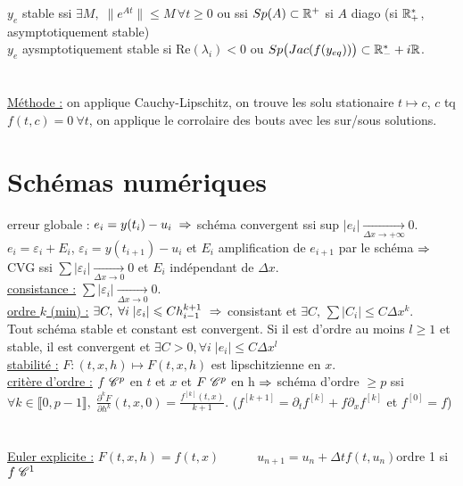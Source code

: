 \documentclass[12 pt]{exampleclass}
\begin{document}
$y_e$ stable ssi $\exists M, \; \|e^{At}\| \leqslant M \, \forall t\geqslant 0$ ou ssi $Sp(A)\subset \mathbb{R}^+$ si $A$ diago (si $\mathbb{R}_+^*$, asymptotiquement stable)\\
$y_e$ aysmptotiquement stable si Re$(\lambda_i)<0$ ou $Sp\big(Jac(f(y_{eq}))\big) \subset \mathbb{R}_-^* + i\mathbb{R}$.\\
\text{}\\
\text{}\\
\underline{Méthode :} on applique Cauchy-Lipschitz, on trouve les solu stationaire $t\mapsto c$, $c$ tq $f(t,c) = 0 \ \forall t$, on applique le corrolaire des bouts avec les sur/sous solutions.\\

\section{Schémas numériques}
erreur globale : $e_i = y(t_i) -u_i \; \Rightarrow$ schéma convergent ssi sup $|e_i| \underset{\Delta x\to +\infty}{\longrightarrow}0$.\\
$e_i = \varepsilon_i + E_i$, $\varepsilon_i =y(t_{i+1}) - u_i$ et $E_i$ amplification de $e_{i+1}$ par le schéma $\Rightarrow$ CVG ssi $\sum |\varepsilon_i| \underset{\Delta x\to 0}{\longrightarrow}0$ et $ E_i$ indépendant de $\Delta x$.\\
\underline{consistance :} $\sum |\varepsilon_i| \underset{\Delta x\to 0}{\longrightarrow} 0$.\\
\underline{ordre $k$ (min) :} $\exists C, \; \forall i \; |\varepsilon_i| \leqslant C h_{i-1}^{k+1} \ \Rightarrow$ consistant et $\exists C, \, \sum |C_i| \leqslant C \Delta x^k$.\\
Tout schéma stable et constant est convergent. Si il est d'ordre au moins $l\geqslant 1$ et stable, il est convergent et $\exists C>0,  \forall i \; |e_i|\leqslant C \Delta x^l$\\
\underline{stabilité :} $F: (t,x,h) \mapsto F(t,x,h)$ est lipschitzienne en $x$.\\
\underline{critère d'ordre :} $f \ \mathscr{C}^p$ en $t$ et $x$ et $F \ \mathscr{C}^p$ en h $\Rightarrow$ schéma d'ordre $\geqslant p$ ssi\\ $\forall k\in \llbracket0,p-1\rrbracket, \; \frac{\partial^k F}{\partial h^k}(t,x,0) = \frac{f^{[k]}(t,x)}{k+1}$. \qquad \quad ($f^{[k+1]} = \partial_t f^{[k]} + f\partial_x f^{[k]}$ et $f^{[0]}=f$)\\
\text{}\\
\text{}\\
\underline{Euler explicite :} $F(t,x,h) =f(t,x) \qquad \quad u_{n+1} = u_n + \Delta t f(t,u_n)$\qquad  ordre 1 si $f\; \mathscr{C}^1$\\
\end{document}
